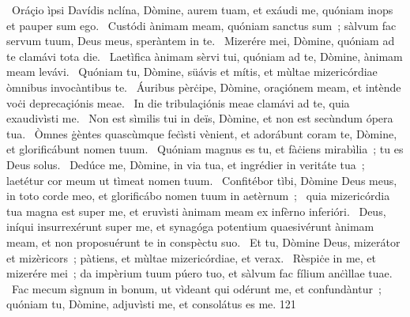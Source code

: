 {~Oráçio ìpsi Davídis}
{%
nclína, Dòmine, aurem tuam, et exáudi me, quóniam inops et pauper sum ego.
~Custódi ànimam meam, quóniam sanctus sum~; sàlvum fac servum tuum, Deus meus, speràntem in te.
~Mizerére mei, Dòmine, quóniam ad te clamávi tota die.
~Laetìfica ànimam sèrvi tui, quóniam ad te, Dòmine, ànimam meam levávi.
~Quóniam tu, Dòmine, süávis et mítis, et mùltae mizericórdiae òmnibus invocàntibus te.
~Áuribus pèrċipe, Dòmine, oraçiónem meam, et intènde voċi deprecaçiónis meae.
~In die tribulaçiónis meae clamávi ad te, quia exaudivìsti me.
~Non est sìmilis tui in deïs, Dòmine, et non est secùndum ópera tua.
~Òmnes ġèntes quascùmque feċìsti vènient, et adorábunt coram te, Dòmine, et glorificábunt nomen tuum.
~Quóniam magnus es tu, et fàċiens mirabìlia~; tu es Deus solus.
~Dedúce me, Dòmine, in via tua, et ingrédier in veritáte tua~; laetétur cor meum ut tìmeat nomen tuum.
~Confitébor tìbi, Dòmine Deus meus, in toto corde meo, et glorificábo nomen tuum in aetèrnum~;
~quia mizericórdia tua magna est super me, et eruvìsti ànimam meam ex infèrno inferióri.
~Deus, iníqui insurrexérunt super me, et synagóga potentium quaesivérunt ànimam meam, et non proposuérunt te in conspèctu suo.
~Et tu, Dòmine Deus, mizerátor et mizèricors~; pàtiens, et mùltae mizericórdiae, et verax.
~Rèspiċe in me, et mizerére mei~; da impèrium tuum púero tuo, et sàlvum fac fílium anċìllae tuae.
~Fac mecum sìgnum in bonum, ut vìdeant qui odérunt me, et confundàntur~; quóniam tu, Dòmine, adjuvìsti me, et consolátus es me.
}
{12}{1}
